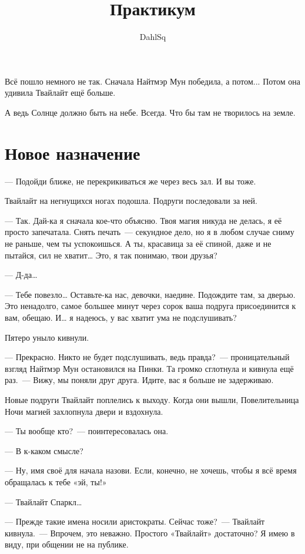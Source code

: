 \documentclass[twoside,a5paper,12pt]{extbook}
\title{Практикум}
\author{DahlSq}
\date{}
\begin{document}
\maketitle

Всё пошло немного не так. Сначала Найтмэр Мун
победила, а потом... Потом она удивила Твайлайт
ещё больше.

А ведь Солнце должно быть на небе. Всегда. Что
бы там не творилось на земле.

\tableofcontents

\chapter{Новое назначение}



— Подойди ближе, не перекрикиваться же через весь зал. И вы тоже.

Твайлайт на негнущихся ногах подошла. Подруги последовали за ней.

— Так. Дай-ка я сначала кое-что объясню. Твоя магия никуда не делась, я её просто запечатала. Снять печать — секундное дело, но я в любом случае сниму не раньше, чем ты успокоишься. А ты, красавица за её спиной, даже и не пытайся, сил не хватит… Это, я так понимаю, твои друзья?

— Д-да…

— Тебе повезло… Оставьте-ка нас, девочки, наедине. Подождите там, за дверью. Это ненадолго, самое большее минут через сорок ваша подруга присоединится к вам, обещаю. И… я надеюсь, у вас хватит ума не подслушивать?

Пятеро уныло кивнули.

— Прекрасно. Никто не будет подслушивать, ведь правда? — проницательный взгляд Найтмэр Мун остановился на Пинки. Та громко сглотнула и кивнула ещё раз. — Вижу, мы поняли друг друга. Идите, вас я больше не задерживаю.

Новые подруги Твайлайт поплелись к выходу. Когда они вышли, Повелительница Ночи магией захлопнула двери и вздохнула.

— Ты вообще кто? — поинтересовалась она.

— В к-каком смысле?

— Ну, имя своё для начала назови. Если, конечно, не хочешь, чтобы я всё время обращалась к тебе «эй, ты!»

— Твайлайт Спаркл…

— Прежде такие имена носили аристократы. Сейчас тоже? — Твайлайт кивнула. — Впрочем, это неважно. Простого «Твайлайт» достаточно? Я имею в виду, при общении не на публике.
\end{document}

